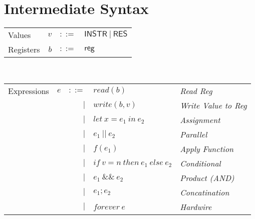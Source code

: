 \documentclass[12pt, letterpaper]{article}
\begin{document}


\section{Intermediate Syntax}


    \begin{tabular}{l r c l}
        Values        & $v$     & $::=$     & $\mathsf{INSTR\ |\ RES}$\\
        Registers     & $b$     & $::=$     & $\mathsf{reg}$
    \end{tabular}\\

    \begin{tabular}{l c r l l}
       Expressions  & $e$    & $::=$  & $read(b)$       
                             & \textit{Read Reg}\\
                    &        & $\mid$ & $write(b,v)$    
                             & \textit{Write Value to Reg}\\
                    &        & $\mid$ & $let\ x = e_1\ in\ e_2$ 
                             & \textit{Assignment}\\  
                    &        & $\mid$ & $e_1\ ||\ e_2$ 
                             & \textit{Parallel}\\
                    &        & $\mid$ & $f(e_1)$        
                             & \textit{Apply Function} \\  
                    &        & $\mid$ & $if\ v = n\ then\ e_1\ else\ e_2$
                             & \textit{Conditional} \\
                    &        & $\mid$ & $e_1\ \&\&\ e_2$ 
                             & \textit{Product (AND)}\\
                    &        & $\mid$ & $e_1 ; e_2$
                             & \textit{Concatination}\\
                    &        & $\mid$ & $forever\ e$ 
                             & \textit{Hardwire}
    \end{tabular}
\end{document}
